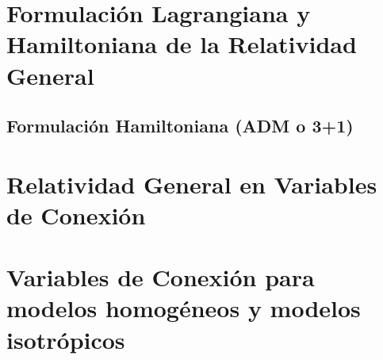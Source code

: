 \documentclass[10pt, letterpaper, spanish]{book}
\theoremstyle{definition}
\theoremstyle{plain}
\theoremstyle{remark}
\theoremstyle{break}
\begin{document}

\chapter{Formulaci\'{o}n Lagrangiana y Hamiltoniana de la Relatividad General}
\label{chp:RG}




\section{Formulaci\'{o}n Hamiltoniana (ADM o 3+1)}









\chapter{Relatividad General en Variables de Conexi\'{o}n}






\chapter{Variables de Conexi\'{o}n para modelos homog\'{e}neos y modelos isotr\'{o}picos}



\end{document}
